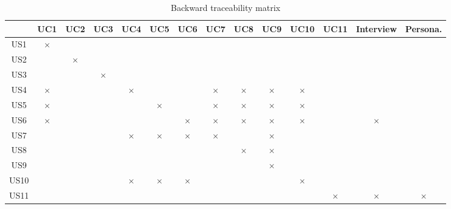 \documentclass[12pt]{article}
\begin{document}
 \begin{table}[h]
    \begin{tabular}{|c|c|c|c|c|c|c|c|c|c|c|c|c|c|}
    \hline
      & UC1 & UC2 & UC3 & UC4 & UC5 & UC6 & UC7 & UC8 & UC9 & UC10 & UC11 & Interview & Persona. \\
      \hline
      US1  & $\times$  &   &  &  &  &  &  &  &  &  &  &  &   \\
      \hline
       US2  &   & $\times$  &  &  &  &  &  &  &  &  &  &  &  \\
       \hline
       US3  &   &   & $\times$ &  &  &  &  &  &  &  &  &  &  \\
       \hline
       US4  & $\times$  &   &  &$\times$  &  &  & $\times$ & $\times$ & $ \times$ &$\times$  &  &  &  \\
       \hline
      US5  & $\times$  &   &  &  & $\times$ &  & $\times$ & $\times$ &$ \times$  & $\times$ &  &  &  \\
       \hline
      US6  & $\times$  &   &  &  &  &$ \times$  & $ \times$ & $ \times$ & $ \times$ & $\times$ &  & $\times$ &  \\
       \hline
        US7  &   &   &  &$\times$  & $\times$ & $\times$ & $\times$ &  & $ \times$ &  &  &  &  \\
       \hline
        US8  &   &   &  &  &  &  &  & $\times$ & $ \times$ &  &  &  &  \\
       \hline
        US9  &   &   &  &  &  &  &  &  & $\times$  &  &  &  &  \\
       \hline
        US10  &   &   &  & $\times$ & $\times$ & $\times$  &  &  &  & $\times$ &  &  &  \\
       \hline
        US11  &   &   &  &  &  &  &  &  &  &  &$\times$  & $\times$ & $\times$  \\
       \hline
    \end{tabular}
    \caption{Backward traceability matrix} 
\label{table:2}
 \end{table}
 
\end{document}
